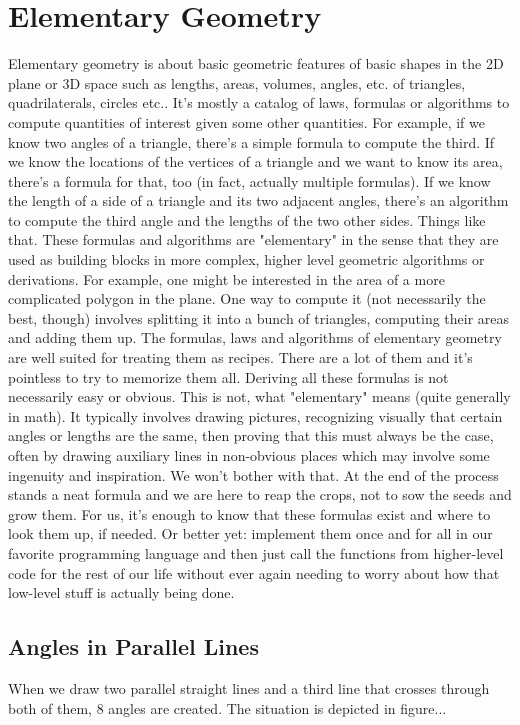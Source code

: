\section{Elementary Geometry}
Elementary geometry is about basic geometric features of basic shapes in the 2D plane or 3D space such as lengths, areas, volumes, angles, etc. of triangles, quadrilaterals, circles etc.. It's mostly a catalog of laws, formulas or algorithms to compute quantities of interest given some other quantities. For example, if we know two angles of a triangle, there's a simple formula to compute the third. If we know the locations of the vertices of a triangle and we want to know its area, there's a formula for that, too (in fact, actually multiple formulas). If we know the length of a side of a triangle and its two adjacent angles, there's an algorithm to compute the third angle and the lengths of the two other sides. Things like that. These formulas and algorithms are "elementary" in the sense that they are used as building blocks in more complex, higher level geometric algorithms or derivations. For example, one might be interested in the area of a more complicated polygon in the plane. One way to compute it (not necessarily the best, though) involves splitting it into a bunch of triangles, computing their areas and adding them up. The formulas, laws and algorithms of elementary geometry are well suited for treating them as recipes. There are a lot of them and it's pointless to try to memorize them all. Deriving all these formulas is not necessarily easy or obvious. This is not, what "elementary" means (quite generally in math). It typically involves drawing pictures, recognizing visually that certain angles or lengths are the same, then proving that this must always be the case, often by drawing auxiliary lines in non-obvious places which may involve some ingenuity and inspiration. We won't bother with that. At the end of the process stands a neat formula and we are here to reap the crops, not to sow the seeds and grow them. For us, it's enough to know that these formulas exist and where to look them up, if needed. Or better yet: implement them once and for all in our favorite programming language and then just call the functions from higher-level code for the rest of our life without ever again needing to worry about how that low-level stuff is actually being done. 

\subsection{Angles in Parallel Lines}
When we draw two parallel straight lines and a third line that crosses through both of them, 8 angles are created. The situation is depicted in figure...

